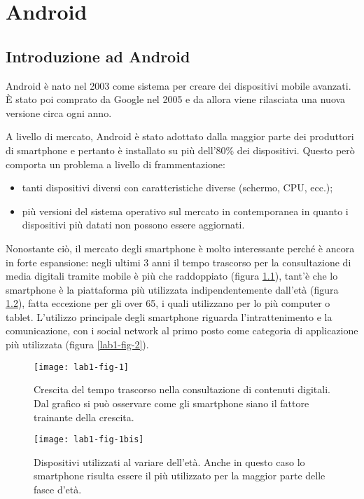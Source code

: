 \part{Android}

\chapter{Introduzione ad Android}

Android è nato nel 2003 come sistema per creare dei dispositivi mobile
avanzati.
\`E stato poi comprato da Google nel 2005 e da allora viene rilasciata
una nuova versione circa ogni anno.

A livello di mercato, Android è stato adottato dalla maggior parte dei
produttori di smartphone e pertanto è installato su più dell'80\% dei
dispositivi.
Questo però comporta un problema a livello di frammentazione:

\begin{itemize}
	\item tanti dispositivi diversi con caratteristiche diverse (schermo, CPU, ecc.);
	\item più versioni del sistema operativo sul mercato in contemporanea in quanto i dispositivi più datati non possono essere aggiornati.
\end{itemize}

Nonostante ciò, il mercato degli smartphone è molto interessante perché è ancora in forte espansione: negli ultimi 3 anni il tempo trascorso per la consultazione di media digitali tramite mobile è più che raddoppiato (figura \ref{lab1-fig-1}), tant'è che lo smartphone è la piattaforma più utilizzata indipendentemente dall'età (figura \ref{lab1-fig-1bis}), fatta eccezione per gli over 65, i quali utilizzano per lo più computer o tablet.
L'utilizzo principale degli smartphone riguarda l'intrattenimento e la comunicazione, con i social network al primo posto come categoria di applicazione più utilizzata (figura \ref{lab1-fig-2}).


\begin{figure}[htbp]
	\centering
	\texttt{[image: lab1-fig-1]}
	\caption[Crescita del tempo trascorso nella consultazione di contenuti digitali]{Crescita del tempo trascorso nella consultazione di contenuti digitali. Dal grafico si può osservare come gli smartphone siano il fattore trainante della crescita.}\label{lab1-fig-1}
\end{figure}

\begin{figure}[htbp]
	\centering
	\texttt{[image: lab1-fig-1bis]}
	\caption[Dispositivi utilizzati al variare dell'età]{Dispositivi utilizzati al variare dell'età. Anche in questo caso lo smartphone risulta essere il più utilizzato per la maggior parte delle fasce d'età.}\label{lab1-fig-1bis}
\end{figure}

